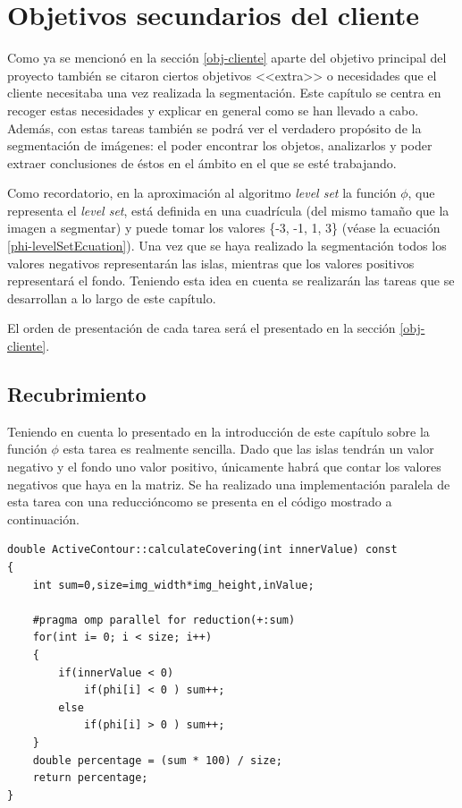 \chapter{Objetivos secundarios del cliente}

Como ya se mencion\'{o} en la secci\'{o}n \ref{obj-cliente} aparte del objetivo principal del proyecto tambi\'{e}n se citaron ciertos objetivos <<extra>> o necesidades que el cliente necesitaba una vez realizada la segmentaci\'{o}n. Este cap\'{i}tulo se centra en recoger estas necesidades y explicar en general como se han llevado a cabo. Adem\'{a}s, con estas tareas tambi\'{e}n se podr\'{a} ver el verdadero prop\'{o}sito de la segmentaci\'{o}n de im\'{a}genes: el poder encontrar los objetos, analizarlos y poder extraer conclusiones de \'{e}stos en el \'{a}mbito en el que se est\'{e} trabajando.

Como recordatorio, en la aproximaci\'{o}n al algoritmo \textit{level set} la funci\'{o}n $\phi$, que representa el \textit{level set}, est\'{a} definida en una cuadr\'{i}cula (del mismo tama\~{n}o que la imagen a segmentar) y puede tomar los valores \{-3, -1, 1, 3\} (v\'{e}ase la ecuaci\'{o}n \ref{phi-levelSetEcuation}). Una vez que se haya realizado la segmentaci\'{o}n todos los valores negativos representar\'{a}n las islas, mientras que los valores positivos representar\'{a} el fondo. Teniendo esta idea en cuenta se realizar\'{a}n las tareas que se desarrollan a lo largo de este cap\'{i}tulo.

El orden de presentaci\'{o}n de cada tarea ser\'{a} el presentado en la secci\'{o}n \ref{obj-cliente}.
\section{Recubrimiento}

Teniendo en cuenta lo presentado en la introducci\'{o}n de este cap\'{i}tulo sobre la funci\'{o}n $\phi$ esta tarea es realmente sencilla. Dado que las islas tendr\'{a}n un valor negativo y el fondo uno valor positivo, \'{u}nicamente habr\'{a} que contar los valores negativos que haya en la matriz. Se ha realizado una implementaci\'{o}n paralela de esta tarea con una reducci\'{o}n\protect\footnotemark como se presenta en el c\'{o}digo mostrado a continuaci\'{o}n. 
\begin{lstlisting}
double ActiveContour::calculateCovering(int innerValue) const
{
	int sum=0,size=img_width*img_height,inValue;
	
	#pragma omp parallel for reduction(+:sum)
	for(int i= 0; i < size; i++)
	{
		if(innerValue < 0)
			if(phi[i] < 0 )	sum++;
		else
			if(phi[i] > 0 )	sum++;
	}
	double percentage = (sum * 100) / size;
	return percentage;
}	
\end{lstlisting}
